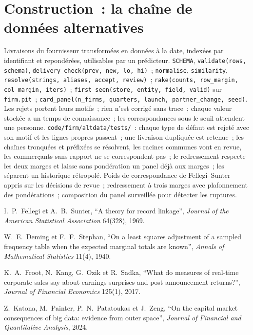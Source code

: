 \section{Construction~: la chaîne de données alternatives}\label{bld:ml:alternative-data-pipelines:altdata}

\begin{build}
 Livraisons du fournisseur transformées en données à la date, indexées par identifiant et repondérées, utilisables par un prédicteur.
 \texttt{SCHEMA}, \texttt{validate(rows, schema)}, \texttt{delivery\_check(prev, new, lo, hi)}~;
\texttt{normalise}, \texttt{similarity}, \texttt{resolve(strings, aliases, accept, review)}~;
\texttt{rake(counts, row\_margin, col\_margin, iters)}~; \texttt{first\_seen(store, entity, field, valid)} sur \texttt{firm.pit}~;
\texttt{card\_panel(n\_firms, quarters, launch, partner\_change, seed)}.
 Les rejets portent leurs motifs~; rien n'est corrigé sans trace~; chaque valeur stockée a un temps de connaissance~;
les correspondances sous le seuil attendent une personne.
 \texttt{code/firm/altdata/tests/}~: chaque type de défaut est rejeté avec son motif et les lignes propres passent~;
une livraison dupliquée est retenue~; les chaînes tronquées et préfixées se résolvent, les racines communes vont en revue, les commerçants sans rapport
ne se correspondent pas~; le redressement respecte les deux marges et laisse sans pondération un panel déjà aux marges~; les 
séparent un historique rétropolé.
 Poids de correspondance de Fellegi--Sunter appris sur les décisions de revue~; redressement à trois marges avec plafonnement des
pondérations~; composition du panel surveillée pour détecter les ruptures.
\end{build}

\begin{omsources}
\item I.~P.~Fellegi et A.~B.~Sunter, ``A theory for record linkage'', \emph{Journal of the American Statistical Association}
64(328), 1969.
\item W.~E.~Deming et F.~F.~Stephan, ``On a least squares adjustment of a sampled frequency table when the expected marginal
totals are known'', \emph{Annals of Mathematical Statistics} 11(4), 1940.
\item K.~A.~Froot, N.~Kang, G.~Ozik et R.~Sadka, ``What do measures of real-time corporate sales say about earnings
surprises and post-announcement returns?'', \emph{Journal of Financial Economics} 125(1), 2017.
\item Z.~Katona, M.~Painter, P.~N.~Patatoukas et J.~Zeng, ``On the capital market consequences of big data: evidence from
outer space'', \emph{Journal of Financial and Quantitative Analysis}, 2024.
\end{omsources}

